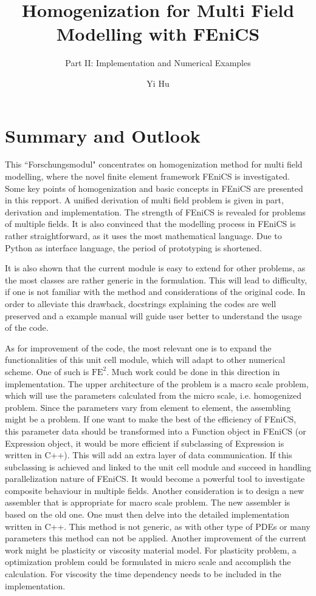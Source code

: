 \documentclass[10pt,a4paper]{scrreprt}
\author{Yi Hu}
\title{Homogenization for Multi Field Modelling with FEniCS}
\subtitle{Part II: Implementation and Numerical Examples}
\begin{document}
\chapter{Summary and Outlook}
This ``Forschungsmodul" concentrates on homogenization method for multi field modelling, where the novel finite element framework FEniCS is investigated. Some key points of homogenization and basic concepts in FEniCS are presented in this repport. A unified derivation of multi field problem is given in part, derivation and implementation. The strength of FEniCS is revealed for problems of multiple fields. It is also convinced that the modelling process in FEniCS is rather straightforward, as it uses the most mathematical language. Due to Python as interface language, the period of prototyping is shortened.

It is also shown that the current module is easy to extend for other problems, as the most classes are rather generic in the formulation. This will lead to difficulty, if one is not familiar with the method and considerations of the original code. In order to alleviate this drawback, docstrings explaining the codes are well preserved and a example manual will guide user better to understand the usage of the code.

As for improvement of the code, the most relevant one is to expand the functionalities of this unit cell module, which will adapt to other numerical scheme. One of such is $\text{FE}^{2}$. Much work could be done in this direction in implementation. The upper architecture of the problem is a macro scale problem, which will use the parameters calculated from the micro scale, i.e. homogenized problem. Since the parameters vary from element to element, the assembling might be a problem. If one want to make the best of the efficiency of FEniCS, this parameter data should be transformed into a Function object in FEniCS (or Expression object, it would be more efficient if subclassing of Expression is written in C++). This will add an extra layer of data communication. If this subclassing is achieved and linked to the unit cell module and succeed in handling parallelization nature of FEniCS. It would become a powerful tool to investigate composite behaviour in multiple fields. Another consideration is to design a new assembler that is appropriate for macro scale problem. The new assembler is based on the old one. One must then delve into the detailed implementation written in C++. This method is not generic, as with other type of PDEs or many parameters this method can not be applied. Another improvement of the current work might be plasticity or viscosity material model. For plasticity problem, a optimization problem could be formulated in micro scale and accomplish the calculation. For viscosity the time dependency needs to be included in the implementation.
\end{document}
